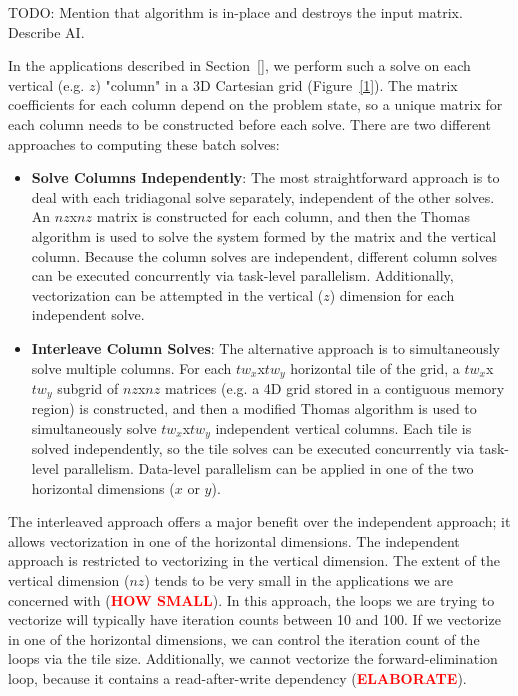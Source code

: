 \documentclass[conference]{IEEEtran}
\newcommand{\fix}[1]{{\bf \textcolor {red}{#1}}}
\begin{document}
TODO: Mention that algorithm is in-place and destroys the input matrix. Describe
AI.

In the applications described in Section~\ref{}, we perform such a solve on
each vertical (e.g. \(z\)) "column" in a 3D Cartesian grid (Figure~\ref{1}). The
matrix coefficients for each column depend on the problem state, so a unique
matrix for each column needs to be constructed before each solve. There are two
different approaches to computing these batch solves:

\begin{itemize}
\item \textbf{Solve Columns Independently}: The most straightforward approach is to deal with each tridiagonal solve separately, independent of the other solves. An \(nz\)x\(nz\) matrix is constructed for each column, and then the Thomas algorithm is used to solve the system formed by the matrix and the vertical column. Because the column solves are independent, different column solves can be executed concurrently via task-level parallelism. Additionally, vectorization can be attempted in the vertical (\(z\)) dimension for each independent solve. 
\item \textbf{Interleave Column Solves}: The alternative approach is to simultaneously solve multiple columns. For each \(tw_x\)x\(tw_y\) horizontal tile of the grid, a \(tw_x\)x\(tw_y\) subgrid of \(nz\)x\(nz\) matrices (e.g. a 4D grid stored in a contiguous memory region) is constructed, and then a modified Thomas algorithm is used to simultaneously solve \(tw_x\)x\(tw_y\) independent vertical columns. Each tile is solved independently, so the tile solves can be executed concurrently via task-level parallelism. Data-level parallelism can be applied in one of the two horizontal dimensions (\(x\) or \(y\)).
\end{itemize}

The interleaved approach offers a major benefit over the independent approach;
it allows vectorization in one of the horizontal dimensions. The independent
approach is restricted to vectorizing in the vertical dimension. The extent of
the vertical dimension (\(nz\)) tends to be very small in the applications we are
concerned with (\fix{HOW SMALL}). In this approach, the loops we are trying to
vectorize will typically have iteration counts between 10 and 100. If we
vectorize in one of the horizontal dimensions, we can control the iteration
count of the loops via the tile size. Additionally, we cannot vectorize the
forward-elimination loop, because it contains a read-after-write dependency
(\fix{ELABORATE}).
\end{document}
